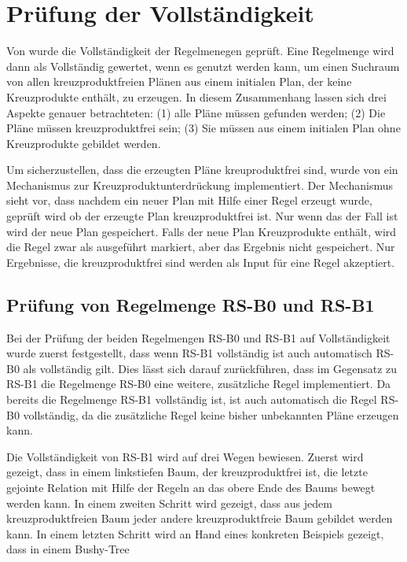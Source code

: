 \section{Prüfung der Vollständigkeit}

Von \cite{shanbhag2014optimizing} wurde die Vollständigkeit der Regelmenegen geprüft. Eine Regelmenge wird dann als Vollständig gewertet, wenn es genutzt werden kann, um einen Suchraum von allen kreuzproduktfreien Plänen aus einem initialen Plan, der keine Kreuzprodukte enthält, zu erzeugen. In diesem Zusammenhang lassen sich drei Aspekte genauer betrachteten: (1) alle Pläne müssen gefunden werden; (2) Die Pläne müssen kreuzproduktfrei sein; (3) Sie müssen aus einem initialen Plan ohne Kreuzprodukte gebildet werden.

Um sicherzustellen, dass die erzeugten Pläne kreuproduktfrei sind, wurde von \cite{shanbhag2014optimizing} ein Mechanismus zur Kreuzproduktunterdrückung implementiert. Der Mechanismus sieht vor, dass nachdem ein neuer Plan mit Hilfe einer Regel erzeugt wurde, geprüft wird ob der erzeugte Plan kreuzproduktfrei ist. Nur wenn das der Fall ist wird der neue Plan gespeichert. Falls der neue Plan Kreuzprodukte enthält, wird die Regel zwar als ausgeführt markiert, aber das Ergebnis nicht gespeichert. Nur Ergebnisse, die kreuzproduktfrei sind werden als Input für eine Regel akzeptiert. 


\subsection{Prüfung von Regelmenge RS-B0 und RS-B1}

Bei der Prüfung der beiden Regelmengen RS-B0 und RS-B1 auf Vollständigkeit wurde zuerst festgestellt, dass wenn RS-B1 vollständig ist auch automatisch RS-B0 als vollständig gilt. Dies lässt sich darauf zurückführen, dass im Gegensatz zu RS-B1 die Regelmenge RS-B0 eine weitere, zusätzliche Regel implementiert. Da bereits die Regelmenge RS-B1 vollständig ist, ist auch automatisch die Regel RS-B0 vollständig, da die zusätzliche Regel keine bisher unbekannten Pläne erzeugen kann.


Die Vollständigkeit von RS-B1 wird auf drei Wegen bewiesen. Zuerst wird gezeigt, dass in einem linkstiefen Baum, der kreuzproduktfrei ist, die letzte gejointe Relation mit Hilfe der Regeln an das obere Ende des Baums bewegt werden kann. In einem zweiten Schritt wird gezeigt, dass aus jedem kreuzproduktfreien Baum jeder andere kreuzproduktfreie Baum gebildet werden kann. In einem letzten Schritt wird an Hand eines konkreten Beispiels gezeigt, dass in einem Bushy-Tree 









